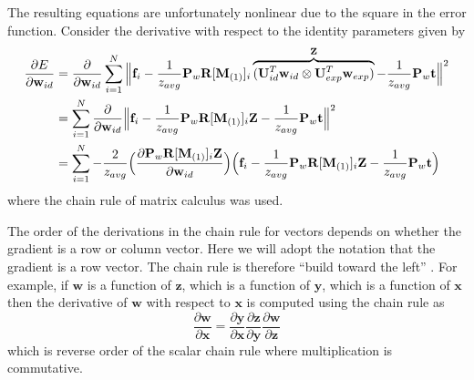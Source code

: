 \documentclass[11pt,a4paper]{report}
\begin{document}
The resulting equations are unfortunately nonlinear due to the square in the error
function. Consider the derivative with respect to the identity parameters given by 
\begin{align*}\label{eq:fit12}
\frac{\partial E}{\partial \mathbf{w}_{id}} &= \frac{\partial}{\partial \mathbf{w}_{id}}\sum_{i=1}^N \Big\Vert\mathbf{f}_i - \frac{1}{z_{avg}}\mathbf{P}_w\mathbf{R}[\mathbf{M}_{(1)}]_{i}\overbrace{(\mathbf{U}_{id}^T\mathbf{w}_{id} \otimes
\mathbf{U}_{exp}^T\mathbf{w}_{exp})}^{\mathbf{Z}} - \frac{1}{z_{avg}}\mathbf{P}_w\mathbf{t}\Big\Vert^2\\
&=\sum_{i=1}^N \frac{\partial}{\partial \mathbf{w}_{id}}\Big\Vert\mathbf{f}_i - \frac{1}{z_{avg}}\mathbf{P}_w\mathbf{R}[\mathbf{M}_{(1)}]_{i}\mathbf{Z} -
\frac{1}{z_{avg}}\mathbf{P}_w\mathbf{t}\Big\Vert^2\\
&=\sum_{i=1}^N -\frac{2}{z_{avg}}\Bigl(\frac{\partial \mathbf{P}_w\mathbf{R}[\mathbf{M}_{(1)}]_{i}\mathbf{Z}}{\partial
  \mathbf{w}_{id}}\Bigr)\Bigl(\mathbf{f}_i -
\frac{1}{z_{avg}}\mathbf{P}_w\mathbf{R}[\mathbf{M}_{(1)}]_{i}\mathbf{Z} -
\frac{1}{z_{avg}}\mathbf{P}_w\mathbf{t}\Bigr)
\end{align*}
where the chain rule of matrix calculus was used. 

The order of the derivations in the chain rule for vectors depends on whether the gradient is a row or column
vector. Here we will adopt the notation that the gradient is a row vector. The
chain rule is therefore ``build toward the left'' \cite{ifemcolorado}. For example, if $\mathbf{w}$
is a function of $\mathbf{z}$, which is a function of $\mathbf{y}$, which is a
function of $\mathbf{x}$ then the derivative of $\mathbf{w}$ with respect to
$\mathbf{x}$ is computed using the chain rule as
\begin{equation*}
\frac{\partial \mathbf{w}}{\partial \mathbf{x}} = \frac{\partial
  \mathbf{y}}{\partial \mathbf{x}}\frac{\partial \mathbf{z}}{\partial
  \mathbf{y}}\frac{\partial \mathbf{w}}{\partial \mathbf{z}} 
\end{equation*}
which is reverse order of the scalar chain rule where multiplication is
commutative.
\end{document}
